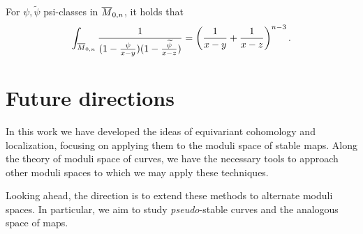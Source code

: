 \documentclass[12pt]{memoir}
\begin{document}
\begin{Lem}
    For $\psi,\widetilde\psi$ psi-classes in $\overline M_{0,n}$, it holds that
    $$\int_{\overline M_{0,n}}\frac{1}{(1-\frac{\psi}{x-y})(1-\frac{\widetilde\psi}{x-z})}=\left(\frac{1}{x-y}+\frac{1}{x-z}\right)^{n-3}.$$
\end{Lem}
\section{Future directions}

In this work we have developed the ideas of equivariant cohomology and localization, focusing on applying them to the moduli space of stable maps. Along the theory of moduli space of curves, we have the necessary tools to approach other moduli spaces to which we may apply these techniques.\par
Looking ahead, the direction is to extend these methods to alternate moduli spaces. In particular, we aim to study \emph{pseudo}-stable curves and the analogous space of maps. 
\ifx\nextra\undefined
\printindex
\else\fi
\nocite{*}


\end{document}
